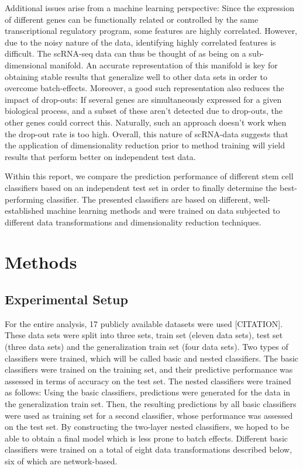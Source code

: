 \documentclass[10pt,conference,compsocconf]{IEEEtran}
\begin{document}
\par
Additional issues arise from a machine learning perspective: Since the expression of different genes can be functionally related or controlled by the same transcriptional regulatory program, some features are highly correlated. However, due to the noisy nature of the data, identifying highly correlated features is difficult. The scRNA-seq data can thus be thought of as being on a sub-dimensional manifold. An accurate representation of this manifold is key for obtaining stable results that generalize well to other data sets in order to overcome batch-effects. Moreover, a good such representation also reduces the impact of drop-outs: If several genes are simultaneously expressed for a given biological process, and a subset of these aren't detected due to drop-outs, the other genes could correct this. Naturally, such an approach doesn't work when the drop-out rate is too high. Overall, this nature of scRNA-data suggests that the application of dimensionality reduction prior to method training will yield results that perform better on independent test data.
\par
Within this report, we compare the prediction performance of different stem cell classifiers based on an independent test set in order to finally determine the best-performing classifier. The presented classifiers are based on different, well-established machine learning methods and were trained on data subjected to different data transformations and dimensionality reduction techniques.

\section*{Methods}
\subsection{Experimental Setup}
For the entire analysis, 17 publicly available datasets were used [CITATION]. These data sets were split into three sets, train set (eleven data sets), test set (three data sets) and the generalization train set (four data sets). Two types of classifiers were trained, which will be called basic and nested classifiers. The basic classifiers were trained on the training set, and their predictive performance was assessed in terms of accuracy on the test set. The nested classifiers were trained as follows: Using the basic classifiers, predictions were generated for the data in the generalization train set. Then, the resulting predictions by all basic classifiers were used as training set for a second classifier, whose performance was assessed on the test set. By constructing the two-layer nested classifiers, we hoped to be able to obtain a final model which is less prone to batch effects. 
Different basic classifiers were trained on a total of eight data transformations described below, six of which are network-based. 
\end{document}
